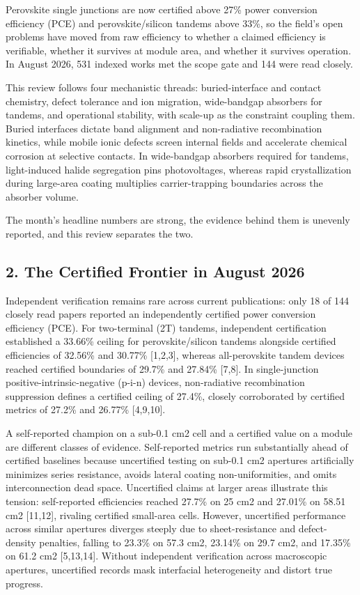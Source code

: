 \documentclass[
  11pt,
]{article}
\begin{document}
Perovskite single junctions are now certified above 27\% power
conversion efficiency (PCE) and perovskite/silicon tandems above 33\%,
so the field's open problems have moved from raw efficiency to whether a
claimed efficiency is verifiable, whether it survives at module area,
and whether it survives operation. In August 2026, 531 indexed works met
the scope gate and 144 were read closely.

This review follows four mechanistic threads: buried-interface and
contact chemistry, defect tolerance and ion migration, wide-bandgap
absorbers for tandems, and operational stability, with scale-up as the
constraint coupling them. Buried interfaces dictate band alignment and
non-radiative recombination kinetics, while mobile ionic defects screen
internal fields and accelerate chemical corrosion at selective contacts.
In wide-bandgap absorbers required for tandems, light-induced halide
segregation pins photovoltages, whereas rapid crystallization during
large-area coating multiplies carrier-trapping boundaries across the
absorber volume.

The month's headline numbers are strong, the evidence behind them is
unevenly reported, and this review separates the two.

\subsection{2. The Certified Frontier in August
2026}\label{the-certified-frontier-in-august-2026}

Independent verification remains rare across current publications: only
18 of 144 closely read papers reported an independently certified power
conversion efficiency (PCE). For two-terminal (2T) tandems, independent
certification established a 33.66\% ceiling for perovskite/silicon
tandems alongside certified efficiencies of 32.56\% and 30.77\%
{[}1,2,3{]}, whereas all-perovskite tandem devices reached certified
boundaries of 29.7\% and 27.84\% {[}7,8{]}. In single-junction
positive-intrinsic-negative (p-i-n) devices, non-radiative recombination
suppression defines a certified ceiling of 27.4\%, closely corroborated
by certified metrics of 27.2\% and 26.77\% {[}4,9,10{]}.

A self-reported champion on a sub-0.1 cm2 cell and a certified value on
a module are different classes of evidence. Self-reported metrics run
substantially ahead of certified baselines because uncertified testing
on sub-0.1 cm2 apertures artificially minimizes series resistance,
avoids lateral coating non-uniformities, and omits interconnection dead
space. Uncertified claims at larger areas illustrate this tension:
self-reported efficiencies reached 27.7\% on 25 cm2 and 27.01\% on 58.51
cm2 {[}11,12{]}, rivaling certified small-area cells. However,
uncertified performance across similar apertures diverges steeply due to
sheet-resistance and defect-density penalties, falling to 23.3\% on 57.3
cm2, 23.14\% on 29.7 cm2, and 17.35\% on 61.2 cm2 {[}5,13,14{]}. Without
independent verification across macroscopic apertures, uncertified
records mask interfacial heterogeneity and distort true progress.
\end{document}
